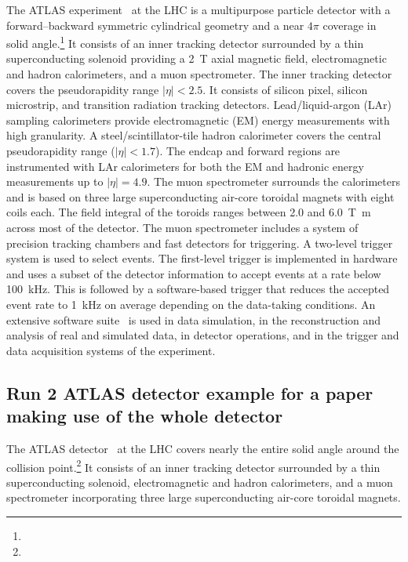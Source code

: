 The ATLAS experiment~\cite{PERF-2007-01} at the LHC is a multipurpose particle detector
with a forward--backward symmetric cylindrical geometry and a near \(4\pi\) coverage in 
solid angle.\footnote{\AtlasCoordFootnote}
It consists of an inner tracking detector surrounded by a thin superconducting solenoid
providing a \qty{2}{\tesla} axial magnetic field, electromagnetic and hadron calorimeters, and a muon spectrometer.
The inner tracking detector covers the pseudorapidity range \(|\eta| < 2.5\).
It consists of silicon pixel, silicon microstrip, and transition radiation tracking detectors.
Lead/liquid-argon (LAr) sampling calorimeters provide electromagnetic (EM) energy measurements
with high granularity.
A steel/scintillator-tile hadron calorimeter covers the central pseudorapidity range (\(|\eta| < 1.7\)).
The endcap and forward regions are instrumented with LAr calorimeters
for both the EM and hadronic energy measurements up to \(|\eta| = 4.9\).
The muon spectrometer surrounds the calorimeters and is based on
three large superconducting air-core toroidal magnets with eight coils each.
The field integral of the toroids ranges between \num{2.0} and \qty{6.0}{\tesla\metre}
across most of the detector. 
The muon spectrometer includes a system of precision tracking chambers and fast detectors for triggering.
A two-level trigger system is used to select events.
The first-level trigger is implemented in hardware and uses a subset of the detector information
to accept events at a rate below \qty{100}{\kHz}.
This is followed by a software-based trigger that
reduces the accepted event rate to \qty{1}{\kHz} on average
depending on the data-taking conditions.
An extensive software suite~\cite{ATL-SOFT-PUB-2021-001} is used in data simulation, in the reconstruction
and analysis of real and simulated data, in detector operations, and in the trigger and data acquisition
systems of the experiment.

\subsection{Run 2 ATLAS detector example for a paper making use of the whole detector}
\label{sec:atlas2b}

The ATLAS detector~\cite{PERF-2007-01} at the LHC covers nearly the entire solid angle around the collision point.\footnote{\AtlasCoordFootnote}
It consists of an inner tracking detector surrounded by a thin superconducting solenoid, electromagnetic and hadron calorimeters,
and a muon spectrometer incorporating three large superconducting air-core toroidal magnets.

